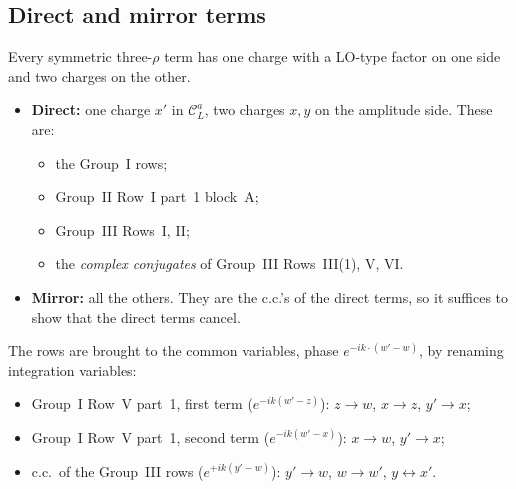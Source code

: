 \documentclass[10pt]{article}
\numberwithin{equation}{section}
\newcommand{\CL}{\mathcal C_L}
\newcommand{\phw}{e^{-ik\cdot(w'-w)}}
\begin{document}
\subsection{Direct and mirror terms}
Every symmetric three-$\rho$ term has one charge with a LO-type factor on one side and two charges on the other.
\begin{itemize}
\item \textbf{Direct:} one charge $x'$ in $\CL^a$, two charges $x,y$ on the amplitude side. These are:
\begin{itemize}
\item the Group~I rows;
\item Group~II Row~I part~1 block~A;
\item Group~III Rows~I, II;
\item the \emph{complex conjugates} of Group~III Rows~III(1), V, VI.
\end{itemize}
\item \textbf{Mirror:} all the others. They are the c.c.'s of the direct terms, so it suffices to show that the direct terms cancel.
\end{itemize}
The rows are brought to the common variables, phase $\phw$, by renaming integration variables:
\begin{itemize}
\item Group~I Row~V part~1, first term ($e^{-ik(w'-z)}$): $z\to w$, $x\to z$, $y'\to x$;
\item Group~I Row~V part~1, second term ($e^{-ik(w'-x)}$): $x\to w$, $y'\to x$;
\item c.c.\ of the Group~III rows ($e^{+ik(y'-w)}$): $y'\to w$, $w\to w'$, $y\leftrightarrow x'$.
\end{itemize}
\end{document}
